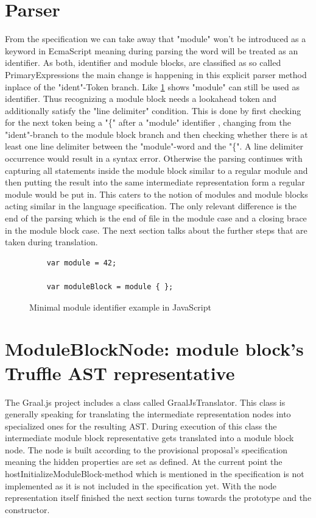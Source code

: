 \section{Parser}

From the specification we can take away that "module" won't be introduced as a keyword in EcmaScript meaning during parsing the word will be treated as an identifier. As both, identifier and module blocks, are classified as so called PrimaryExpressions the main change is happening in this explicit parser method inplace of the "ident"-Token branch. Like \ref{lst:impl:minModule} shows "module" can still be used as identifier. Thus recognizing a module block needs a lookahead token and additionally satisfy the "line delimiter" condition. This is done by first checking for the next token being a "\{" after a "module" identifier , changing from the "ident"-branch to the module block branch and then checking whether there is at least one line delimiter between the "module"-word and the "\{". A line delimiter occurrence would result in a syntax error. Otherwise the parsing continues with capturing all statements inside the module block similar to a regular module and then putting the result into the same intermediate representation form a regular module would be put in. This caters to the notion of modules and module blocks acting similar in the language specification. The only relevant difference is the end of the parsing which is the end of file in the module case and a closing brace in the module block case. The next section talks about the further steps that are taken during translation.
\begin{figure}[h!]
\begin{lstlisting}
    var module = 42;
    
    var moduleBlock = module { };
\end{lstlisting}
\caption{Minimal module identifier example in JavaScript}
\label{lst:impl:minModule}
\end{figure}

\section{ModuleBlockNode: module block's Truffle AST representative}

The Graal.js project includes a class called GraalJsTranslator. This class is generally speaking for translating the intermediate representation nodes into specialized ones for the resulting AST. During execution of this class the intermediate module block representative gets translated into a module block node. The node is built according to the provisional proposal's specification meaning the hidden properties are set as defined. At the current point the hostInitializeModuleBlock-method which is mentioned in the specification is not implemented as it is not included in the specification yet. With the node representation itself finished the next section turns towards the prototype and the constructor.

